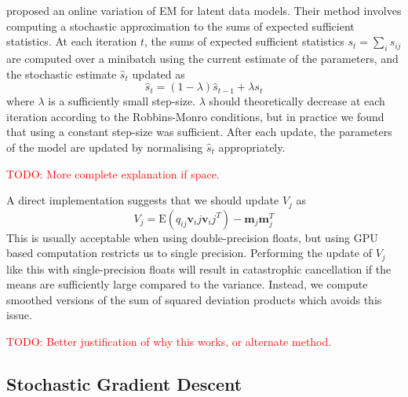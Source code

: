 \documentclass{article}
\newcommand{\bv}{\mathbf{v}}
\newcommand{\bm}{\mathbf{m}}
\newcommand{\todo}[1]{\textcolor{red}{TODO: #1}}
\begin{document}
\citet{cappeOnlineExpectationMaximization2009} proposed an online variation of EM for latent data models.
Their method involves computing a stochastic approximation to the sums of expected sufficient statistics.
At each iteration $t$, the sums of expected sufficient statistics $s_t = \sum_i s_{ij}$ are computed over a minibatch using the current estimate of the parameters, and the stochastic estimate $\hat{s}_t$ updated as
\begin{equation}
 \hat{s}_{t} = (1 - \lambda)\hat{s}_{t-1} + \lambda s_t
\end{equation}
where $\lambda$ is a sufficiently small step-size.
$\lambda$ should theoretically decrease at each iteration according to the Robbins-Monro conditions, but in practice we found that using a constant step-size was sufficient.
After each update, the parameters of the model are updated by normalising $\hat{s}_t$ appropriately.

\todo{More complete explanation if space.}

A direct implementation suggests that we should update $V_j$ as
\begin{equation}
V_j  = \mathrm{E}(q_{ij} \bv_ij \bv_ij^T) - \bm_j \bm_j^T
\end{equation}
This is usually acceptable when using double-precision floats, but using GPU based computation restricts us to single precision.
Performing the update of $V_j$ like this with single-precision floats will result in catastrophic cancellation if the means are sufficiently large compared to the variance.
Instead, we compute smoothed versions of the sum of squared deviation products which avoids this issue.
\begin{equation}
\end{equation}

\todo{Better justification of why this works, or alternate method.}

\subsection{Stochastic Gradient Descent}
\end{document}
